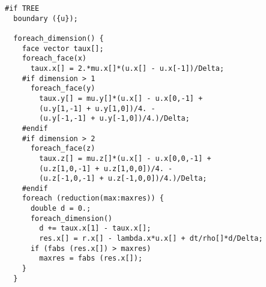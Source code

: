 \documentclass[a4paper]{article}
\newcommand{\para}[1]{\textbf{\emph{\textcolor{para}{#1}}}}
\begin{document}
\begin{multicols}{2}
  \columnbreak
  \begin{verbatim}
#if TREE
  boundary ({u});
  
  foreach_dimension() {
    face vector taux[];
    foreach_face(x)
      taux.x[] = 2.*mu.x[]*(u.x[] - u.x[-1])/Delta;
    #if dimension > 1
      foreach_face(y)
        taux.y[] = mu.y[]*(u.x[] - u.x[0,-1] + 
        (u.y[1,-1] + u.y[1,0])/4. -
        (u.y[-1,-1] + u.y[-1,0])/4.)/Delta;
    #endif
    #if dimension > 2
      foreach_face(z)
        taux.z[] = mu.z[]*(u.x[] - u.x[0,0,-1] + 
        (u.z[1,0,-1] + u.z[1,0,0])/4. -
        (u.z[-1,0,-1] + u.z[-1,0,0])/4.)/Delta;
    #endif
    foreach (reduction(max:maxres)) {
      double d = 0.;
      foreach_dimension()
        d += taux.x[1] - taux.x[];
        res.x[] = r.x[] - lambda.x*u.x[] + dt/rho[]*d/Delta;
      if (fabs (res.x[]) > maxres)
        maxres = fabs (res.x[]);
    }
  }
  \end{verbatim}
\end{multicols}

\begin{center}
\end{center}
\end{document}
